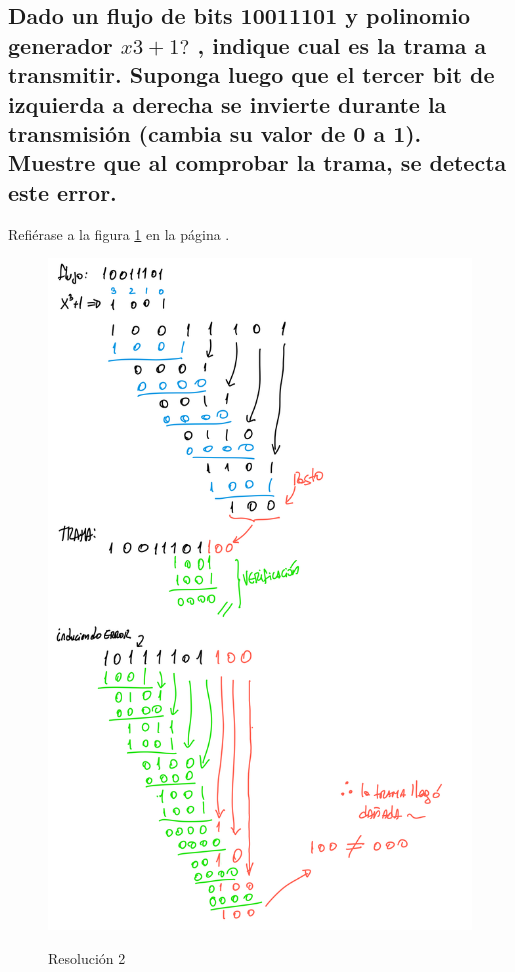 \documentclass[11pt]{utalcaDoc}
\begin{document}
\subsection{Dado un flujo de bits 10011101 y polinomio generador $x3 + 1?$ , indique cual es la trama a transmitir. Suponga luego que el tercer bit de izquierda a derecha se invierte durante la transmisión (cambia su valor de 0 a 1). Muestre que al comprobar la trama, se detecta este error.}
Refiérase a la figura \ref{FIG:resolucion2} en la página \pageref{FIG:resolucion2}.
\begin{figure}[ht]
	\centering
	\includegraphics[height=.6\textheight]{images/2}\\
	\caption{Resolución 2}
	\label{FIG:resolucion2}
\end{figure}
\end{document}
